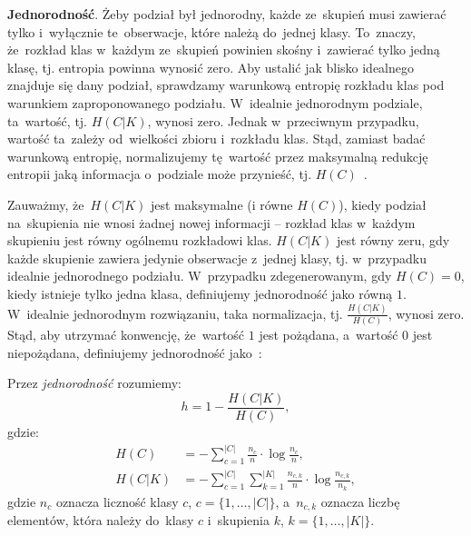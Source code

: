 \documentclass{praca1}
\begin{document}
\textbf{Jednorodność}. Żeby podział był jednorodny, każde ze~skupień musi zawierać tylko i~wyłącznie te~obserwacje, które należą do~jednej klasy. To~znaczy, że~rozkład klas w~każdym ze~skupień powinien skośny i~zawierać tylko jedną klasę, tj. entropia powinna wynosić zero. Aby ustalić jak blisko idealnego znajduje się dany podział, sprawdzamy warunkową entropię rozkładu klas pod warunkiem zaproponowanego podziału. W~idealnie jednorodnym podziale, ta~wartość, tj. $H(C|K)$, wynosi zero. Jednak w~przeciwnym przypadku, wartość ta~zależy od~wielkości zbioru i~rozkładu klas. Stąd, zamiast badać warunkową entropię, normalizujemy tę~wartość przez maksymalną redukcję entropii jaką informacja o~podziale może przynieść, tj. $H(C)$~\cite{Rosenberg2007:vmeasure}.

Zauważmy, że~$H(C|K)$ jest maksymalne (i równe $H(C)$), kiedy podział na~skupienia nie wnosi żadnej nowej informacji -- rozkład klas w~każdym skupieniu jest równy ogólnemu rozkładowi klas. $H(C|K)$ jest równy zeru, gdy każde skupienie zawiera jedynie obserwacje z~jednej klasy, tj. w~przypadku idealnie jednorodnego podziału. W~przypadku zdegenerowanym, gdy $H(C) = 0$, kiedy istnieje tylko jedna klasa, definiujemy jednorodność jako równą $1$. W~idealnie jednorodnym rozwiązaniu, taka normalizacja, tj. $\frac{H(C|K)}{H(C)}$, wynosi zero. Stąd, aby utrzymać konwencję, że~wartość $1$ jest pożądana, a~wartość $0$ jest niepożądana, definiujemy jednorodność jako~\cite{Rosenberg2007:vmeasure}:

\begin{definition}
Przez \emph{jednorodność} rozumiemy:
\begin{equation}
h = %
1 - \frac{H(C|K)}{H(C)}, %
\end{equation}
gdzie:
\begin{align*}
H(C) & = - \sum\limits_{c = 1}^{|C|}\frac{n_c}{n}\cdot \log{\frac{n_c}{n}},  \\
H(C|K) & = - \sum\limits_{c = 1}^{|C|}\sum\limits_{k = 1}^{|K|}\frac{n_{c,k}}{n}\cdot \log{\frac{n_{c,k}}{n_k}},
\end{align*}
gdzie $n_c$ oznacza liczność klasy $c$, $c = \{1,\ldots, |C|\}$, a~$n_{c,k}$ oznacza liczbę elementów, która należy do~klasy $c$ i~skupienia $k$, $k = \{1,\ldots, |K|\}$.
\end{definition}
\end{document}
